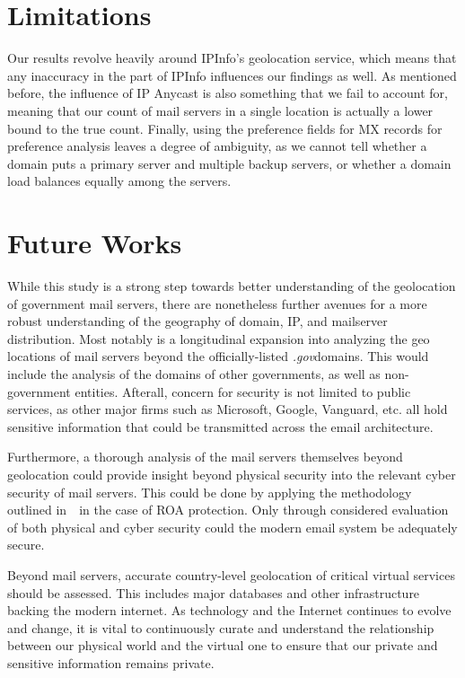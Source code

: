 \documentclass{hotnets21}
\newcommand{\dotgov}{\textit{.gov}\space}
\begin{document}
\section{Limitations}

Our results revolve heavily around IPInfo’s geolocation service, which means that any inaccuracy in the part of IPInfo influences our findings as well.
As mentioned before, the influence of IP Anycast is also something that we fail to account for, meaning that our count of mail servers in a single location is actually a lower bound to the true count.
Finally, using the preference fields for MX records for preference analysis leaves a degree of ambiguity, as we cannot tell whether a domain puts a primary server and multiple backup servers, or whether a domain load balances equally among the servers.

\section{Future Works}

While this study is a strong step towards better understanding of the geolocation of government mail servers, there are nonetheless further avenues for a more robust understanding of the geography of domain, IP, and mailserver distribution.
Most notably is a longitudinal expansion into analyzing the geo locations of mail servers beyond the officially-listed \dotgov domains.
This would include the analysis of the domains of other governments, as well as non-government entities.
Afterall, concern for security is not limited to public services, as other major firms such as Microsoft, Google, Vanguard, etc. all hold sensitive information that could be transmitted across the email architecture.

Furthermore, a thorough analysis of the mail servers themselves beyond geolocation could provide insight beyond physical security into the relevant cyber security of mail servers.
This could be done by applying the methodology outlined in~\cite{bartoli}~in the case of ROA protection.
Only through considered evaluation of both physical and cyber security could the modern email system be adequately secure.

Beyond mail servers, accurate country-level geolocation of critical virtual services should be assessed.
This includes major databases and other infrastructure backing the modern internet.
As technology and the Internet continues to evolve and change, it is vital to continuously curate and understand the relationship between our physical world and the virtual one to ensure that our private and sensitive information remains private.
\end{document}
